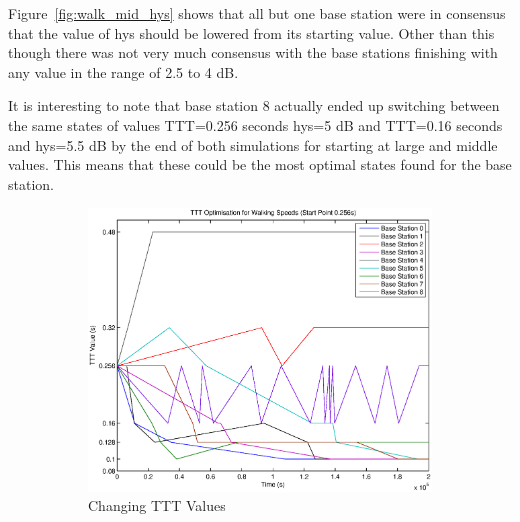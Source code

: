 Figure~\ref{fig:walk_mid_hys} shows that all but one base station were in consensus that the value of hys should be lowered from its starting value. Other than this though there was not very much consensus with the base stations finishing with any value in the range of 2.5 to 4 dB.

It is interesting to note that base station 8 actually ended up switching between the same states of values TTT=0.256 seconds hys=5 dB and TTT=0.16 seconds and hys=5.5 dB by the end of both simulations for starting at large and middle values. This means that these could be the most optimal states found for the base station.
\begin{figure}[H]
        \centering
        \begin{subfigure}[b]{0.49\textwidth}
                \includegraphics[width=\textwidth]{figures/walking_figures/mid/long_ttt.eps}
                \caption{Changing TTT Values}
                \label{fig:walk_mid_ttt}
        \end{subfigure}%
        ~ %
        \begin{subfigure}[b]{0.49\textwidth}

\end{subfigure}
\end{figure}
